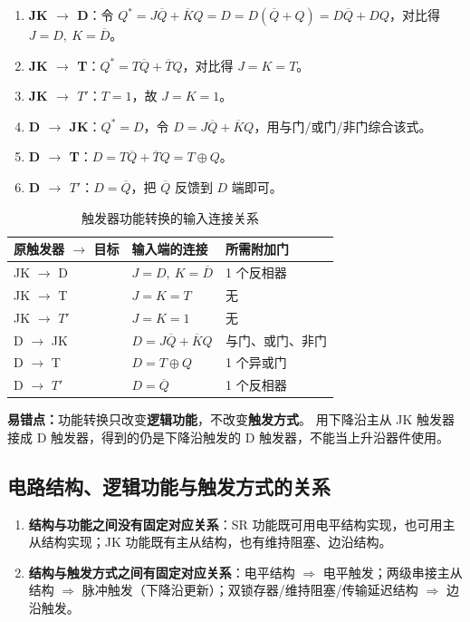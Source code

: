 \begin{enumerate}
    \item \textbf{JK $\rightarrow$ D}：令 $Q^*=J\overline{Q}+\overline{K}Q=D=D(\overline{Q}+Q)=D\overline{Q}+DQ$，对比得 $J=D,\ K=\overline{D}$。
    \item \textbf{JK $\rightarrow$ T}：$Q^*=T\overline{Q}+\overline{T}Q$，对比得 $J=K=T$。
    \item \textbf{JK $\rightarrow$ $T'$}：$T=1$，故 $J=K=1$。
    \item \textbf{D $\rightarrow$ JK}：$Q^*=D$，令 $D=J\overline{Q}+\overline{K}Q$，用与门/或门/非门综合该式。
    \item \textbf{D $\rightarrow$ T}：$D=T\overline{Q}+\overline{T}Q=T\oplus Q$。
    \item \textbf{D $\rightarrow$ $T'$}：$D=\overline{Q}$，把 $\overline{Q}$ 反馈到 $D$ 端即可。
\end{enumerate}

\begin{table}[!htbp]
\centering
\caption{触发器功能转换的输入连接关系}
\begin{tabular}{lll}
\toprule
原触发器 $\rightarrow$ 目标 & 输入端的连接 & 所需附加门 \\
\midrule
JK $\rightarrow$ D & $J=D,\ K=\overline{D}$ & 1 个反相器 \\
JK $\rightarrow$ T & $J=K=T$ & 无 \\
JK $\rightarrow$ $T'$ & $J=K=1$ & 无 \\
D $\rightarrow$ JK & $D=J\overline{Q}+\overline{K}Q$ & 与门、或门、非门 \\
D $\rightarrow$ T & $D=T\oplus Q$ & 1 个异或门 \\
D $\rightarrow$ $T'$ & $D=\overline{Q}$ & 1 个反相器 \\
\bottomrule
\end{tabular}
\end{table}

\noindent\textbf{易错点：}功能转换只改变\textbf{逻辑功能}，不改变\textbf{触发方式}。
用下降沿主从 JK 触发器接成 D 触发器，得到的仍是下降沿触发的 D 触发器，不能当上升沿器件使用。

\subsection{电路结构、逻辑功能与触发方式的关系}
\label{sec:ff_relation}
\begin{enumerate}
    \item \textbf{结构与功能之间没有固定对应关系}：SR 功能既可用电平结构实现，也可用主从结构实现；JK 功能既有主从结构，也有维持阻塞、边沿结构。
    \item \textbf{结构与触发方式之间有固定对应关系}：电平结构 $\Rightarrow$ 电平触发；两级串接主从结构 $\Rightarrow$ 脉冲触发（下降沿更新）；双锁存器/维持阻塞/传输延迟结构 $\Rightarrow$ 边沿触发。
\end{enumerate}

